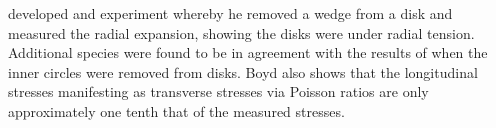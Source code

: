 \cite{boyd1950a} developed and experiment whereby he removed a wedge from a disk
and measured the radial expansion, showing the disks were under radial
tension. Additional species were found to be in agreement with the
results of \cite{jacobs1945l} when the inner circles were removed from disks. Boyd also shows
that the longitudinal stresses manifesting as transverse stresses via Poisson
ratios are only approximately one tenth that of the measured stresses.